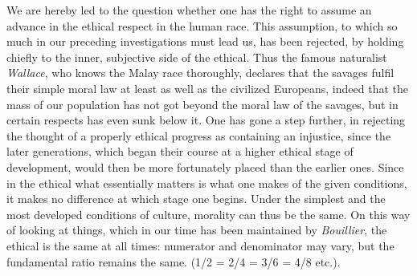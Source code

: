 \documentclass[12pt,a4paper,openany]{book}
\newcommand{\opage}[1]{\marginnote{\footnotesize\textit{[#1]}}}
\begin{document}
We are hereby led to the question whether one has the right to assume an
advance in the ethical respect in the human race. This assumption, to
which so much in our preceding investigations must lead us, has been
rejected, by holding chiefly to the inner, subjective side of the
ethical. Thus the famous naturalist \emph{Wallace}, who knows the Malay race
thoroughly, declares that the savages fulfil their simple moral law at
least as well as the civilized Europeans, indeed that the mass of our
population has not got beyond the moral law of the savages, but in certain
respects has even sunk below it. One has gone a step further, in rejecting
the thought of a properly ethical progress as containing an injustice,
since the later generations, which began their course at a higher ethical
stage of development, would then be more fortunately placed than the
earlier ones. Since in the ethical what essentially matters is what one
makes of the given conditions, it makes no difference at which stage one
begins. Under the simplest and the most developed conditions of culture,
morality can thus be the same. On this way of looking at things, which in
our time has been maintained by \emph{Bouillier}, the ethical is the same
\opage{93}at all times: numerator and denominator may vary, but the
fundamental ratio remains the same. (1/2 = 2/4 = 3/6 = 4/8 etc.).
\end{document}
